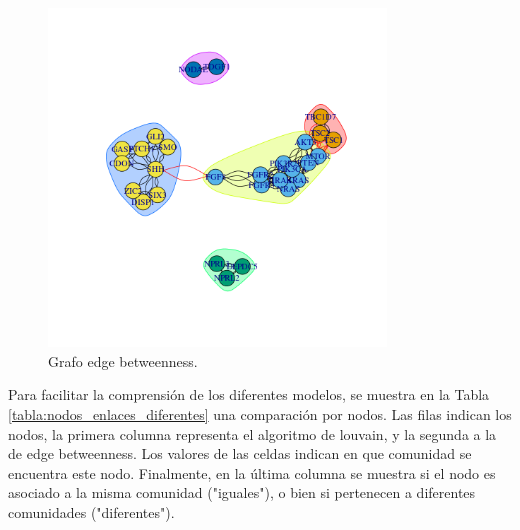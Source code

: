 \begin{figure}[!]
  \centering
  \includegraphics[width=0.8\textwidth]{figures/grafo_alternativo_comunidades.png}
  \caption{Grafo edge betweenness.}
  \label{fig:Grafo_between}
\end{figure}

Para facilitar la comprensión de los diferentes modelos, se muestra en la Tabla \ref{tabla:nodos_enlaces_diferentes} una comparación por nodos. Las filas indican los nodos, la primera columna representa el algoritmo de louvain, y la segunda a la de edge betweenness. Los valores de las celdas indican en que comunidad se encuentra este nodo. Finalmente, en la última columna se muestra si el nodo es asociado a la misma comunidad ("iguales"), o bien si pertenecen a diferentes comunidades ("diferentes").

